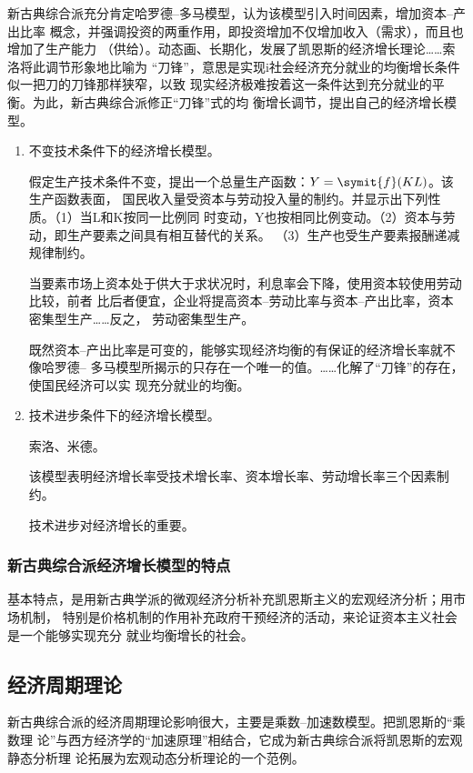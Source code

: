 新古典综合派充分肯定哈罗德--多马模型，认为该模型引入时间因素，增加资本--产出比率
概念，并强调投资的两重作用，即投资增加不仅增加收入（需求），而且也增加了生产能力
（供给）。动态画、长期化，发展了凯恩斯的经济增长理论……索洛将此调节形象地比喻为
“刀锋”，意思是实现i社会经济充分就业的均衡增长条件似一把刀的刀锋那样狭窄，以致
现实经济极难按着这一条件达到充分就业的平衡。为此，新古典综合派修正“刀锋”式的均
衡增长调节，提出自己的经济增长模型。

\begin{enumerate}
\item 不变技术条件下的经济增长模型。

  假定生产技术条件不变，提出一个总量生产函数：$Y=\symit{f}(KL)$。该生产函数表面，
  国民收入量受资本与劳动投入量的制约。并显示出下列性质。（1）当L和K按同一比例同
  时变动，Y也按相同比例变动。（2）资本与劳动，即生产要素之间具有相互替代的关系。
  （3）生产也受生产要素报酬递减规律制约。

  当要素市场上资本处于供大于求状况时，利息率会下降，使用资本较使用劳动比较，前者
  比后者便宜，企业将提高资本--劳动比率与资本--产出比率，资本密集型生产……反之，
  劳动密集型生产。

  既然资本--产出比率是可变的，能够实现经济均衡的有保证的经济增长率就不像哈罗德--
  多马模型所揭示的只存在一个唯一的值。……化解了“刀锋”的存在，使国民经济可以实
  现充分就业的均衡。


\item 技术进步条件下的经济增长模型。

  索洛、米德。

  该模型表明经济增长率受技术增长率、资本增长率、劳动增长率三个因素制约。

  技术进步对经济增长的重要。

\end{enumerate}

\subsubsection{新古典综合派经济增长模型的特点}

基本特点，是用新古典学派的微观经济分析补充凯恩斯主义的宏观经济分析；用市场机制，
特别是价格机制的作用补充政府干预经济的活动，来论证资本主义社会是一个能够实现充分
就业均衡增长的社会。

\subsection{经济周期理论}

新古典综合派的经济周期理论影响很大，主要是乘数--加速数模型。把凯恩斯的“乘数理
论”与西方经济学的“加速原理”相结合，它成为新古典综合派将凯恩斯的宏观静态分析理
论拓展为宏观动态分析理论的一个范例。

